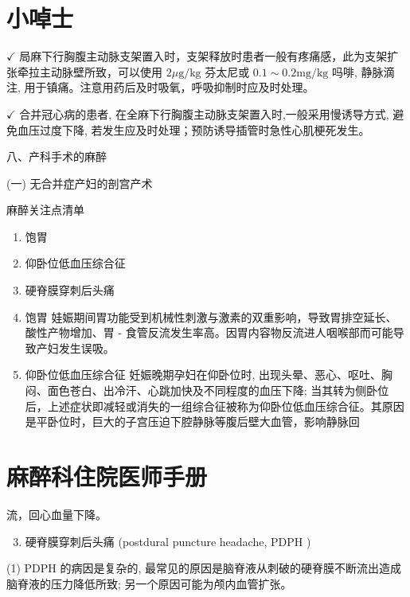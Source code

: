 \documentclass[10pt]{article}
\begin{document}
\section*{小啅士}
$\checkmark$ 局麻下行胸腹主动脉支架置入时，支架释放时患者一般有疼痛感，此为支架扩张牵拉主动脉壁所致，可以使用 $2 \mu \mathrm{g} / \mathrm{kg}$ 芬太尼或 $0.1 \sim 0.2 \mathrm{mg} / \mathrm{kg}$ 吗啡, 静脉滴注, 用于镇痛。注意用药后及时吸氧，呼吸抑制时应及时处理。

$\checkmark$ 合并冠心病的患者, 在全麻下行胸腹主动脉支架置入时,一般采用慢诱导方式, 避免血压过度下降, 若发生应及时处理；预防诱导插管时急性心肌梗死发生。

八、产科手术的麻醉

(一) 无合并症产妇的剖宫产术

麻醉关注点清单

\begin{enumerate}
  \item 饱胃

  \item 仰卧位低血压综合征

  \item 硬脊膜穿刺后头痛

  \item 饱胃 娃娠期间胃功能受到机械性刺激与激素的双重影响，导致胃排空延长、酸性产物增加、胃 - 食管反流发生率高。因胃内容物反流进人咽喉部而可能导致产妇发生误吸。

  \item 仰卧位低血压综合征 妊娠晚期孕妇在仰卧位时, 出现头晕、恶心、呕吐、胸闷、面色苍白、出冷汗、心跳加快及不同程度的血压下降; 当其转为侧卧位后，上述症状即减轻或消失的一组综合征被称为仰卧位低血压综合征。其原因是平卧位时，巨大的子宫压迫下腔静脉等腹后壁大血管，影响静脉回

\end{enumerate}

\section*{麻醉科住院医师手册}
流，回心血量下降。

\begin{enumerate}
  \setcounter{enumi}{2}
  \item 硬脊膜穿刺后头痛 (postdural puncture headache, PDPH )
\end{enumerate}

(1) PDPH 的病因是复杂的, 最常见的原因是脑脊液从刺破的硬脊膜不断流出造成脑脊液的压力降低所致; 另一个原因可能为颅内血管扩张。
\end{document}

